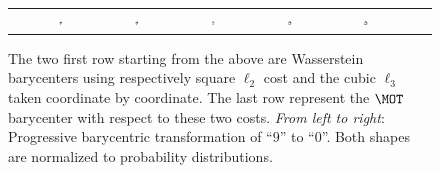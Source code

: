 \begin{figure}[h]
\begin{tabular}{@{}c@{}c@{}c@{}c@{}c@{}c@{}c@{}c@{}}
\\[-.15cm]
&
\includegraphics[width=0.14\textwidth]{figures/bary_GOT_0.png}&
\includegraphics[width=0.14\textwidth]{figures/bary_GOT_1.png}&
\includegraphics[width=0.14\textwidth]{figures/bary_GOT_2.png}&
\includegraphics[width=0.14\textwidth]{figures/bary_GOT_3.png}&
\includegraphics[width=0.14\textwidth]{figures/bary_GOT_4.png}&

\end{tabular}
\caption{The two first row starting from the above are Wasserstein barycenters using respectively square $\ell_2$ cost  and the cubic $\ell_3$ taken coordinate by coordinate. The last row represent the $\MOT$ barycenter with respect to these two costs. \textit{From left to right}:  Progressive barycentric transformation of ``$9$'' to ``$0$''. Both shapes are normalized to probability distributions.  \label{fig:bary90}}
\end{figure}


